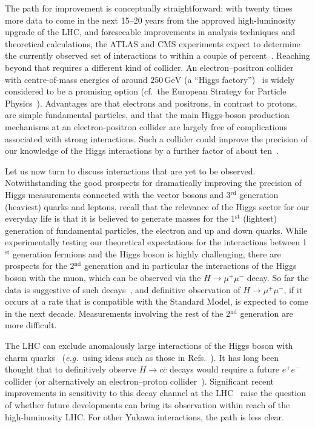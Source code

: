 \documentclass{article}
\newcommand{\GeV}{\,\text{GeV}}
\begin{document}
The path for improvement is conceptually straightforward: with twenty
times more data to come in the next 15--20 years from the
approved high-luminosity upgrade of the LHC, and foreseeable improvements in
analysis techniques and theoretical calculations, the ATLAS and CMS
experiments expect to determine the currently observed set of
interactions to within a couple of percent~\cite{Dainese:2019rgk}.
%
Reaching beyond that requires a different kind of collider.
%
An electron--positron collider with centre-of-mass energies of around
$250\GeV$ (a ``Higgs factory'')~
\cite{FCC:2018evy,Roloff:2018dqu,Baer:2013cma,CEPCStudyGroup:2018ghi,Bai:2021rdg}
is widely considered to be a promising option (cf.\ the European Strategy
for Particle Physics~\cite{CERN-ESU-015}).
%
Advantages are that electrons and positrons, in contrast to protons,
are simple fundamental particles, and that the main Higgs-boson production
mechanisms at an electron-positron collider are largely free of
complications associated with strong interactions.
% 
Such a collider could improve the precision of our knowledge of the
Higgs interactions by a further factor of about ten~\cite{deBlas:2019rxi}.
%

Let us now turn to discuss interactions that are yet to be observed.
%
Notwithstanding the good prospects for dramatically improving the
precision of Higgs measurements connected with the vector bosons and 3$^\text{rd}$
generation (heaviest) quarks and leptons, 
%
recall that the relevance of the Higgs sector for our everyday life is
that it is believed to generate masses for the 1$^\text{st}$
(lightest) generation of fundamental particles, the electron and up and
down quarks.
While experimentally testing our theoretical expectations for the interactions between 1$^\text{st}$ generation fermions and the Higgs boson is highly
challenging, there are prospects for the 2$^\text{nd}$ generation and
in particular the interactions of the Higgs boson with the muon, which
can be observed via the $H \to \mu^+\mu^-$ decay.
So far the data is suggestive of such
decays~\cite{ATLAS:2020fzp,CMS:2020xwi}, and definitive observation of
$H \to \mu^+\mu^-$, if it occurs at a rate that is compatible with the
Standard Model, is expected to come in the next decade.
%
Measurements involving the rest of the 2$^\text{nd}$ generation are more difficult.

The LHC can exclude anomalously large interactions of the Higgs boson
with charm quarks~\cite{Dainese:2019rgk} ({\it e.g.}\ using ideas such as
those in Refs.~\cite{Bishara:2016jga,Soreq:2016rae}).
%
It has long been thought that to definitively observe $H \to c\bar c$
decays would require a future $e^+e^-$ collider (or alternatively an
electron--proton collider~\cite{Andre:2022xeh}).
%
Significant recent improvements in sensitivity to this decay channel
at the LHC~\cite{ATLAS:2022ers,CMS:2022psv} raise the question of
whether future developments can bring its observation within reach of
the high-luminosity LHC.
%
For other Yukawa interactions, the path is less clear.
\end{document}
